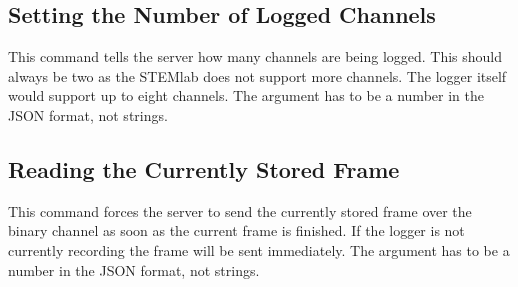\vfill
{}
\vfill

\clearpage
\subsection{Setting the Number of Logged Channels} %
\label{subsec:devguide:server:no_of_logged_channels}

This command tells the server how  many channels are being logged. This should
always be two as the STEMlab does not support more channels. The logger itself
would support up  to eight channels.  The  argument has to be a  number in the
JSON format, not strings.

\vspace{2ex}

\subsection{Reading the Currently Stored Frame} %
\label{subsec:devguide:server:currently_stored_frame}

This command  forces the server  to send the  currently stored frame  over the
binary channel as soon as the current  frame is finished. If the logger is not
currently recording  the frame will  be sent immediately.   The 
argument has to be a number in the JSON format, not strings.

